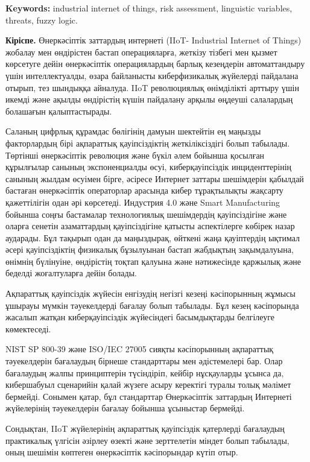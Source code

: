 {\bfseries Keywords:} industrial internet of things, risk assessment,
linguistic variables, threats, fuzzy logic.

\begin{multicols}{2}
{\bfseries Кіріспе.} Өнеркәсіптік заттардың интернеті (IIoT- Industrial
Internet of Things) жобалау мен өндірістен бастап операцияларға, жеткізу
тізбегі мен қызмет көрсетуге дейін өнеркәсіптік операциялардың барлық
кезеңдерін автоматтандыру үшін интеллектуалды, өзара байланысты
киберфизикалық жүйелерді пайдалана отырып, тез шындыққа айналуда. IIoT
революциялық өнімділікті арттыру үшін икемді және ақылды өндірістің
күшін пайдалану арқылы өңдеуші салалардың болашағын қалыптастырады.

Саланың цифрлық құрамдас бөлігінің дамуын шектейтін ең маңызды
факторлардың бірі ақпараттық қауіпсіздіктің жеткіліксіздігі болып
табылады. Төртінші өнеркәсіптік революция және бүкіл әлем бойынша
қосылған құрылғылар санының экспоненциалды өсуі, киберқауіпсіздік
инциденттерінің санының жылдам өсуімен бірге, әсіресе Интернет заттары
шешімдерін қабылдай бастаған өнеркәсіптік операторлар арасында кибер
тұрақтылықты жақсарту қажеттілігін одан әрі көрсетеді. Индустрия 4.0
және Smart Manufacturing бойынша соңғы бастамалар технологиялық
шешімдердің қауіпсіздігіне және оларға сенетін азаматтардың
қауіпсіздігіне қатысты аспектілерге көбірек назар аударады. Бұл тақырып
одан да маңыздырақ, өйткені жаңа қауіптердің ықтимал әсері
қауіпсіздіктің физикалық бұзылуынан бастап жабдықтың зақымдалуына,
өнімнің бүлінуіне, өндірістің тоқтап қалуына және нәтижесінде қаржылық
және беделді жоғалтуларға дейін болады.

Ақпараттық қауіпсіздік жүйесін енгізудің негізгі кезеңі кәсіпорынның
жұмысы ұшырауы мүмкін тәуекелдерді бағалау болып табылады. Бұл кезең
кәсіпорында жасалып жатқан киберқауіпсіздік жүйесіндегі басымдықтарды
белгілеуге көмектеседі.

NIST SP 800-39 және ISO/IEC 27005 сияқты кәсіпорынның ақпараттық
тәуекелдерін бағалаудың бірнеше стандарттары мен әдістемелері бар. Олар
бағалаудың жалпы принциптерін түсіндіріп, кейбір нұсқауларды ұсынса да,
кибершабуыл сценарийін қалай жүзеге асыру керектігі туралы толық мәлімет
бермейді. Сонымен қатар, бұл стандарттар Өнеркәсіптік заттардың
Интернеті жүйелерінің тәуекелдерін бағалау бойынша ұсыныстар бермейді.

Сондықтан, IIoT жүйелерінің ақпараттық қауіпсіздік қатерлерді бағалаудың
практикалық үлгісін әзірлеу өзекті және зерттелетін міндет болып
табылады, оның шешімін көптеген өнеркәсіптік кәсіпорындар күтіп отыр.


\end{multicols}
